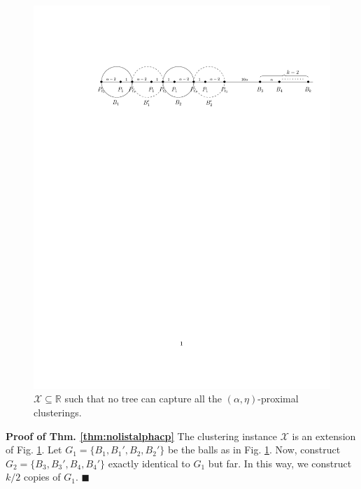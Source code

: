 \documentclass[orivec]{llncs}
\newcommand{\mc}{\mathcal}
\renewcommand{\qed}{\hfill\ensuremath{\blacksquare}}
\begin{document}
\begin{figure}[!t]
\begin{center}
\includegraphics[trim={47mm 205mm 12mm 44mm},clip,width=\textwidth]{figures/lbdFig2}
\end{center}
\vspace{-1cm}
\caption{$\mc X \subseteq \mathbb{R}$ such that no tree can capture all the $(\alpha, \eta)$-proximal clusterings.}
\label{fig:noalgalphacp}
\end{figure}

\noindent\textbf{Proof of Thm. \ref{thm:nolistalphacp}}
The clustering instance $\mc X$ is an extension of Fig. \ref{fig:noalgalphacp}. Let  $G_1 = \{B_1, B_1', B_2, B_2'\}$ be the balls as in Fig. \ref{fig:noalgalphacp}. Now, construct $G_2 = \{B_3, B_3', B_4, B_4'\}$ exactly identical to $G_1$ but far. In this way, we construct $k/2$ copies of $G_1$. \qed\\
\end{document}
